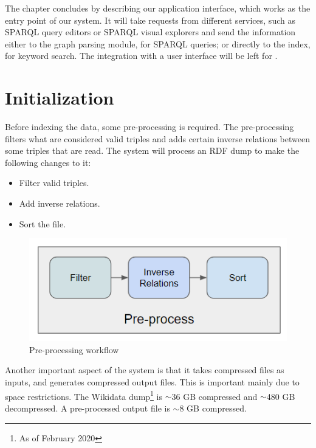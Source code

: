 The chapter concludes by describing our application interface, which works as the entry point of our system. 
It will take requests from different services, such as SPARQL query editors or SPARQL visual explorers and send the information either to the graph parsing module, for SPARQL queries; 
or directly to the index, for keyword search. 
The integration with a user interface will be left for .


\section{Initialization}
\label{chap:init}

Before indexing the data, some pre-processing is required. 
The pre-processing filters what are considered valid triples and adds certain inverse relations between some triples that are read. 
The system will process an RDF dump to make the following changes to it:
\begin{itemize}
    \item Filter valid triples.
    \item Add inverse relations.
    \item Sort the file.
\end{itemize}

\begin{figure}[H]
    \centering
        \includegraphics[width=0.5\linewidth]{imagenes/Preprocess.png}
        \caption{Pre-processing workflow}
        \label{fig:preprocess}
\end{figure}

Another important aspect of the system is that it takes compressed files as inputs, and generates compressed output files. 
This is important mainly due to space restrictions. 
The Wikidata dump\footnote{As of February 2020} is $\sim$36 GB compressed and $\sim$480 GB decompressed.
A pre-processed output file is $\sim$8 GB compressed. 

